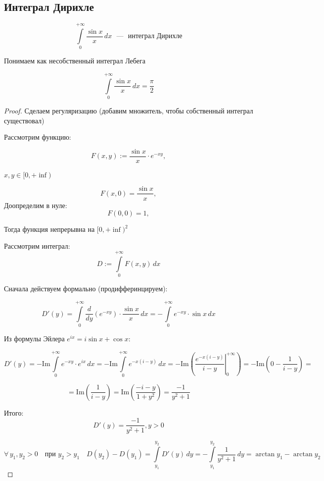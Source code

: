 \subsection{Интеграл Дирихле}

\[
    \int\limits_0^{+\infty} \frac{\sin x}{x} \, dx \text{ ~---~ интеграл Дирихле}
\]

\begin{note}
Понимаем как несобственный интеграл Лебега
\end{note}

\begin{theorem}
\[
    \int\limits_0^{+\infty} \frac{\sin x}{x} \, dx = \frac{\pi}{2}
\]

\end{theorem}

\begin{proof}

\noindent

Сделаем регуляризацию (добавим множитель, чтобы собственный интеграл существовал)
    
Рассмотрим функцию:

\[
F(x, y) := \frac{\sin x}{x} \cdot e^{-x y},
\]

$x, y \in [0, +\inf)$

\[
F(x, 0) = \frac{\sin x}{x},
\]
Доопределим в нуле:
\[
F(0, 0) = 1,  
\]

Тогда функция непрерывна на $[0, +\inf) ^2$

Рассмотрим интеграл:
\[
D := \int\limits_0^{+\infty}F(x, y) \,d x
\]

Сначала действуем формально (продифферинцируем):

\[
    D'(y) = \int\limits_0^{+\infty} \frac{d}{dy} \left( e^{-x y} \right) \cdot \frac{\sin x}{x} \, dx = - \int\limits_0^{+\infty} e^{-x y} \cdot \sin x \, dx
\]

Из формулы Эйлера $e^{ix} = i \sin x + \cos x$:

\[
D'(y) = -\mathrm{Im} \int\limits_0^{+\infty} e^{-xy} \cdot e^{ix} \, dx
= -\mathrm{Im} \int\limits_0^{+\infty} e^{-x(i - y)}\, dx
= -\mathrm{Im} \left( \left. \frac{e^{-x(i - y)}}{i - y} \right|_0^{+\infty} \right) = -\mathrm{Im}\left( 0 - \frac{1}{i-y}\right) =
\]

\[
= \mathrm{Im} \left( \frac{1}{i - y} \right) = \mathrm{Im} \left( \frac{-i - y}{1 + y^2} \right)
= \frac{-1}{y^2 + 1}
\] 

Итого:
\[
D'(y) = \frac{-1}{y^2 + 1}, y > 0
\]

\[
\forall\, y_1, y_2 > 0 \quad \text{при } y_2 > y_1 \quad
D(y_2) - D(y_1) = \int\limits_{y_1}^{y_2} D'(y) \, dy
= - \int\limits_{y_1}^{y_2} \frac{1}{y^2 + 1} \, dy = \arctan{y_1} - \arctan{y_2}
\]


\end{proof}
